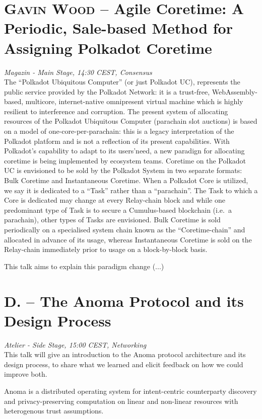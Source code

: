 \section {\textsc{Gavin Wood} -- Agile Coretime: A Periodic, Sale-based Method for Assigning Polkadot Coretime
} \noindent \textit {Magazin - Main Stage, 14:30 CEST, Consensus
}\\[1em] The ``Polkadot Ubiquitous Computer'' (or just Polkadot UC), represents the public service provided by the Polkadot Network: it is a trust-free, WebAssembly-based, multicore, internet-native omnipresent virtual machine which is highly resilient to interference and corruption. The present system of allocating resources of the Polkadot Ubiquitous Computer (parachain slot auctions) is based on a model of one-core-per-parachain: this is a legacy interpretation of the Polkadot platform and is not a reflection of its present capabilities. With Polkadot's capability to adapt to its users'need, a new paradign for allocating coretime is being implemented by ecosystem teams. Coretime on the Polkadot UC is envisioned to be sold by the Polkadot System in two separate formats: Bulk Coretime and Instantaneous Coretime. When a Polkadot Core is utilized, we say it is dedicated to a ``Task'' rather than a ``parachain''. The Task to which a Core is dedicated may change at every Relay-chain block and while one predominant type of Task is to secure a Cumulus-based blockchain (i.e.~a parachain), other types of Tasks are envisioned. Bulk Coretime is sold periodically on a specialised system chain known as the ``Coretime-chain'' and allocated in advance of its usage, whereas Instantaneous Coretime is sold on the Relay-chain immediately prior to usage on a block-by-block basis.

This talk aims to explain this paradigm change
(...)\clearpage
\section {\textsc{D.} -- The Anoma Protocol and its Design Process
} \noindent \textit {Atelier - Side Stage, 15:00 CEST, Networking
}\\[1em] This talk will give an introduction to the Anoma protocol architecture and its design process, to share what we learned and elicit feedback on how we could improve both.

Anoma is a distributed operating system for intent-centric counterparty discovery and privacy-preserving computation on linear and non-linear resources with heterogenous trust assumptions.

